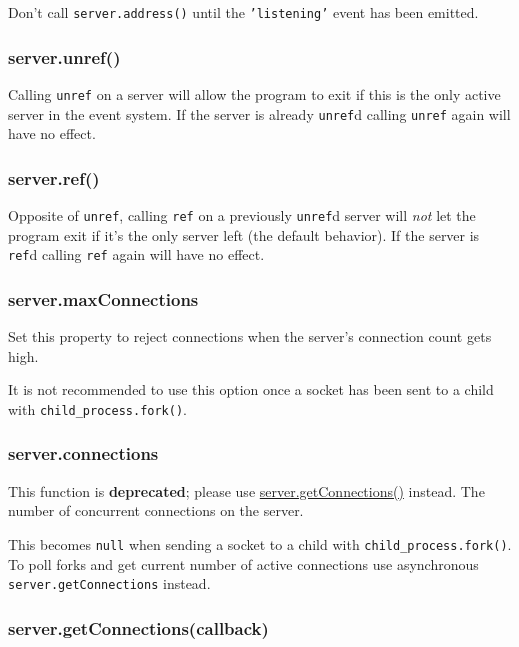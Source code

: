 Don't call \texttt{server.address()} until the \texttt{'listening'}
event has been emitted.

\subsubsection{server.unref()}\label{server.unref}

Calling \texttt{unref} on a server will allow the program to exit if
this is the only active server in the event system. If the server is
already \texttt{unref}d calling \texttt{unref} again will have no
effect.

\subsubsection{server.ref()}\label{server.ref}

Opposite of \texttt{unref}, calling \texttt{ref} on a previously
\texttt{unref}d server will \emph{not} let the program exit if it's the
only server left (the default behavior). If the server is \texttt{ref}d
calling \texttt{ref} again will have no effect.

\subsubsection{server.maxConnections}\label{server.maxconnections}

Set this property to reject connections when the server's connection
count gets high.

It is not recommended to use this option once a socket has been sent to
a child with \texttt{child\_process.fork()}.

\subsubsection{server.connections}\label{server.connections}

This function is \textbf{deprecated}; please use
\hyperref[netux5fserverux5fgetconnectionsux5fcallback]{server.getConnections()}
instead. The number of concurrent connections on the server.

This becomes \texttt{null} when sending a socket to a child with
\texttt{child\_process.fork()}. To poll forks and get current number of
active connections use asynchronous \texttt{server.getConnections}
instead.

\subsubsection{server.getConnections(callback)}\label{server.getconnectionscallback}


